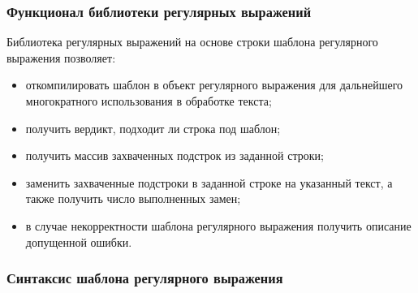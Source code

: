 \subsubsection{Функционал библиотеки регулярных выражений}

Библиотека регулярных выражений на основе строки шаблона регулярного выражения позволяет:
\begin{itemize}
	\item откомпилировать шаблон в объект регулярного выражения для дальнейшего многократного использования в обработке текста;
	\item получить вердикт, подходит ли строка под шаблон; 
	\item получить массив захваченных подстрок из заданной строки;
	\item заменить захваченные подстроки в заданной строке на указанный текст, а также получить число выполненных замен;
	\item в случае некорректности шаблона регулярного выражения получить описание допущенной ошибки.
\end{itemize}

\subsubsection{Синтаксис шаблона регулярного выражения}

